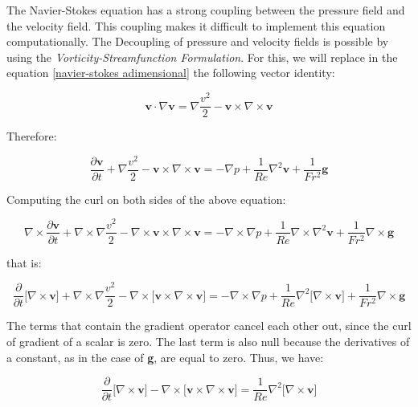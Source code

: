 The Navier-Stokes equation has a strong coupling between
 the pressure field and the velocity field.
 This coupling makes it difficult to implement this
 equation computationally. The Decoupling of pressure
 and velocity fields is possible by using the
 \textit{Vorticity-Streamfunction Formulation}.
 For this, we will replace in the equation
 \ref{navier-stokes adimensional} the following vector identity:

\begin{equation}
 \textbf{v} \cdot \nabla \textbf{v}
 = 
 \nabla \frac{v^{2}}{2}
 - 
 \textbf{v} \times \nabla \times \textbf{v}
\end{equation}

\medskip
\noindent
Therefore:

\begin{equation}
 \frac{\partial \textbf{v}}{\partial t} 
 + 
 \nabla \frac{v^{2}}{2}
 - 
 \textbf{v} \times \nabla \times \textbf{v}
 =
 -
 \nabla p
 +
 \frac{1}{Re} \nabla^{2} \textbf{v}
 +
 \frac{1}{Fr^{2}} \textbf{g}
\end{equation}

\medskip
\noindent
Computing the curl on both sides of the above equation:

\begin{equation}
 \nabla \times \frac{\partial \textbf{v}}{\partial t} 
 + 
 \nabla \times \nabla \frac{v^{2}}{2}
 - 
 \nabla \times \textbf{v} \times \nabla \times \textbf{v}
 =
 -
 \nabla \times \nabla p
 +
 \frac{1}{Re} \nabla \times \nabla^{2} \textbf{v}
 +
 \frac{1}{Fr^{2}} \nabla \times \textbf{g}
\end{equation}

\medskip
\noindent
that is:

\begin{equation}
 \frac{\partial}{\partial t} \big[ \nabla \times \textbf{v} \big]
 + 
 \nabla \times \nabla \frac{v^{2}}{2}
 - 
 \nabla \times \big[ \textbf{v} \times \nabla \times \textbf{v} \big]
 =
 -
 \nabla \times \nabla p
 +
 \frac{1}{Re} \nabla^{2} \big[ \nabla \times \textbf{v} \big]
 +
 \frac{1}{Fr^{2}} \nabla \times \textbf{g}
\end{equation}

\medskip
The terms that contain the gradient operator cancel
 each other out, since the curl of gradient of a scalar is zero.
 The last term is also null because the derivatives of a constant,
 as in the case of \textbf{g}, are equal to zero. Thus, we have:

\begin{equation}
 \frac{\partial}{\partial t} \big[ \nabla \times \textbf{v} \big]
 - 
 \nabla \times \big[ \textbf{v} \times \nabla \times \textbf{v} \big]
 =
 \frac{1}{Re} \nabla^{2} \big[ \nabla \times \textbf{v} \big]
\end{equation}

